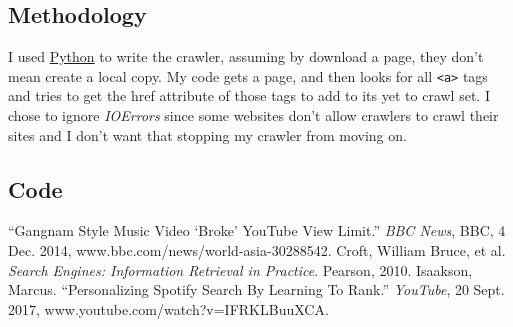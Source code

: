 \documentclass[10pt,letterpaper,bibliography=totoc]{scrartcl}
\begin{document}
\subsection{Methodology}
I used \href{www.python.org}{Python} to write the crawler, assuming by download a page, they don't mean create a local copy. My code gets a page, and then looks for all \texttt{<a>} tags and tries to get the href attribute of those tags to add to its yet to crawl set. I chose to ignore \textit{IOErrors} since some websites don't allow crawlers to crawl their sites and I don't want that stopping my crawler from moving on.
\clearpage

\subsection{Code}


\clearpage

\begin{thebibliography}{9}
    ``Gangnam Style Music Video `Broke' YouTube View Limit.'' \textit{BBC News}, BBC, 4 Dec. 2014, www.bbc.com/news/world-asia-30288542.
    Croft, William Bruce, et al. \textit{Search Engines: Information Retrieval in Practice}. Pearson, 2010.
    Isaakson, Marcus. ``Personalizing Spotify Search By Learning To Rank.'' \textit{YouTube}, 20 Sept. 2017, www.youtube.com/watch?v=IFRKLBuuXCA.
\end{thebibliography}
\end{document}
